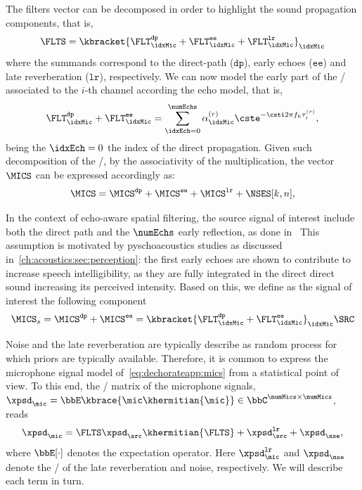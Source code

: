 \mynewline
The filters vector can be decomposed in order to highlight the sound propagation components, that is,
\begin{equation}
    \FLTS = \kbracket{\FLT^{\mathtt{dp}}_{\idxMic}+ \FLT^{\mathtt{ee}}_{\idxMic} + \FLT^{\mathtt{lr}}_{\idxMic} }_\idxMic
\end{equation}
where the summands correspond to the direct-path ($\mathtt{dp}$), early echoes ($\mathtt{ee}$) and late reverberation ($\mathtt{lr}$), respectively.
We can now model the early part of the \RIR/ associated to the $i$-th channel according the echo model, that is,
\begin{equation}\label{eq:dechorateapp:echomodel}
    \FLT^{\mathtt{dp}}_{\idxMic}+ \FLT^{\mathtt{ee}}_{\idxMic} = \sum_{\idxEch=0}^{\numEchs} \alpha_{\idxMic}^{(r)} \cste^{-\csti 2 \pi f_k \tau_i^{(r)}}
    ,
\end{equation}
being the $\idxEch=0$ the index of the direct propagation.
Given such decomposition of the \RIRs/, by the associativity of the multiplication, the vector $\MICS$ can be expressed accordingly as:
\begin{equation}\label{eq:dechorateapp:mics}
    \MICS = \MICS^{\mathtt{dp}} + \MICS^{\mathtt{ee}} + \MICS^{\mathtt{lr}} + \NSES[k,n]
    ,
\end{equation}

\mynewline
In the context of echo-aware spatial filtering, the source signal of interest include both the direct path and the $\numEchs$ early reflection, as done in~
This assumption is motivated by pyschoacoustics studies as discussed in~\cref{ch:acoustics:sec:perception}:
the first early echoes are shown to contribute to increase speech intelligibility, as they are fully integrated in the direct direct sound increasing its perceived intensity.
Based on this, we define as the signal of interest the following component
\begin{equation}\label{eq:dechorateapp:target}
    \MICS_s = \MICS^{\mathtt{dp}} + \MICS^{\mathtt{ee}} = \kbracket{\FLT^{\mathtt{dp}}_{\idxMic}+ \FLT^{\mathtt{ee}}_{\idxMic}}_\idxMic \SRC
\end{equation}

\mynewline
Noise and the late reverberation are typically describe as random process for which priors are typically available.
Therefore, it is common to express the microphone signal model of~\cref{eq:dechorateapp:mics} from a statistical point of view.
To this end, the \xPSD/ matrix of the microphone signals, $\xpsd_{\mic} = \bbE\kbrace{\mic \khermitian{\mic}} \in \bbC^{\numMics \times \numMics}$, reads
\begin{equation}
    \xpsd_{\mic} = \FLTS \xpsd_{\src} \khermitian{\FLTS} + \xpsd^{\mathtt{lr}}_{\src} + \xpsd_{\nse}
    ,
\end{equation}
where $\bbE[\cdot]$ denotes the expectation operator.
Here $\xpsd^{\mathtt{lr}}_{\mic}$ and $\xpsd_{\nse}$ denote the \xPSD/ of the late reverberation and noise, respectively.
We will describe each term in turn.

